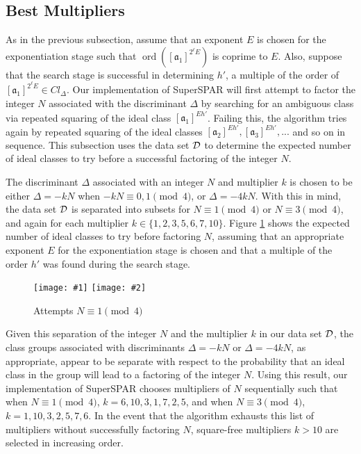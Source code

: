 \documentclass{ucalgthes1}
\theoremstyle{definition}
\DeclareMathOperator{\ord}{ord}
\newcommand{\ideal}{\mathfrak}
\newcommand{\idealclass}[1]{\left[ \ideal #1 \right]}
\newcommand{\mygraphTwo}[4]{
	\begin{figure}[htb]
	\centering
	\texttt{[image: \#1]}
	\texttt{[image: \#2]}
	\caption{#4}
	\label{#3}
	\end{figure}
}
\begin{document}
\subsection{Best Multipliers}
\label{subsec:ssparBestMultipliers}

As in the previous subsection, assume that an exponent $E$ is chosen for the exponentiation stage such that $\ord(\idealclass{a_1}^{2^\ell E})$ is coprime to $E$.  Also, suppose that the search stage is successful in determining $h'$, a multiple of the order of $\idealclass{a_1}^{2^\ell E} \in Cl_\Delta$.  Our implementation of SuperSPAR will first attempt to factor the integer $N$ associated with the discriminant $\Delta$ by searching for an ambiguous class via repeated squaring of the ideal class $\idealclass{a_1}^{Eh'}$.  Failing this, the algorithm tries again by repeated squaring of the ideal classes $\idealclass{a_2}^{Eh'}, \idealclass{a_3}^{Eh'}, ...$ and so on in sequence.  This subsection uses the data set $\mathcal D$ to determine the expected number of ideal classes to try before a successful factoring of the integer $N$.

The discriminant $\Delta$ associated with an integer $N$ and multiplier $k$ is chosen to be either $\Delta = -kN$ when $-kN \equiv 0, 1 \pmod 4$, or $\Delta = -4kN$.  With this in mind, the data set $\mathcal D$ is separated into subsets for $N \equiv 1 \pmod 4$ or $N \equiv 3 \pmod 4$, and again for each multiplier $k \in \{1, 2, 3, 5, 6, 7, 10\}$.  Figure \ref{fig:ssparIdealAttempts} shows the expected number of ideal classes to try before factoring $N$, assuming that an appropriate exponent $E$ for the exponentiation stage is chosen and that a multiple of the order $h'$ was found during the search stage.

\mygraphTwo{attempts-n1}{attempts-n3}{fig:ssparIdealAttempts}{Attempts $N \equiv 1 \pmod 4$}

Given this separation of the integer $N$ and the multiplier $k$ in our data set $\mathcal D$, the class groups associated with discriminants $\Delta = -kN$ or $\Delta = -4kN$, as appropriate, appear to be separate with respect to the probability that an ideal class in the group will lead to a factoring of the integer $N$.  Using this result, our implementation of SuperSPAR chooses multipliers of $N$ sequentially such that when $N \equiv 1 \pmod 4$, $k=6, 10, 3, 1, 7, 2, 5$, and when $N \equiv 3 \pmod 4$, $k=1, 10, 3, 2, 5, 7, 6$.  In the event that the algorithm exhausts this list of multipliers without successfully factoring $N$, square-free multipliers $k > 10$ are selected in increasing order.
\end{document}
